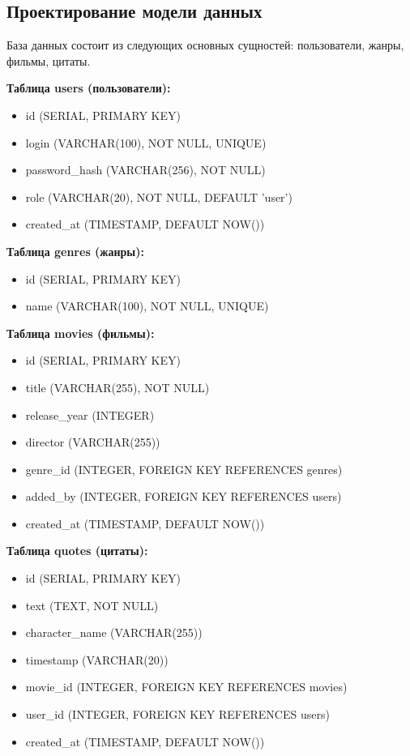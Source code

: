 \subsection{Проектирование модели данных}

База данных состоит из следующих основных сущностей: пользователи, жанры, фильмы, цитаты.

\textbf{Таблица users (пользователи):}
\begin{itemize}
    \item id (SERIAL, PRIMARY KEY)
    \item login (VARCHAR(100), NOT NULL, UNIQUE)
    \item password\_hash (VARCHAR(256), NOT NULL)
    \item role (VARCHAR(20), NOT NULL, DEFAULT 'user')
    \item created\_at (TIMESTAMP, DEFAULT NOW())
\end{itemize}

\textbf{Таблица genres (жанры):}
\begin{itemize}
    \item id (SERIAL, PRIMARY KEY)
    \item name (VARCHAR(100), NOT NULL, UNIQUE)
\end{itemize}

\textbf{Таблица movies (фильмы):}
\begin{itemize}
    \item id (SERIAL, PRIMARY KEY)
    \item title (VARCHAR(255), NOT NULL)
    \item release\_year (INTEGER)
    \item director (VARCHAR(255))
    \item genre\_id (INTEGER, FOREIGN KEY REFERENCES genres)
    \item added\_by (INTEGER, FOREIGN KEY REFERENCES users)
    \item created\_at (TIMESTAMP, DEFAULT NOW())
\end{itemize}

\textbf{Таблица quotes (цитаты):}
\begin{itemize}
    \item id (SERIAL, PRIMARY KEY)
    \item text (TEXT, NOT NULL)
    \item character\_name (VARCHAR(255))
    \item timestamp (VARCHAR(20))
    \item movie\_id (INTEGER, FOREIGN KEY REFERENCES movies)
    \item user\_id (INTEGER, FOREIGN KEY REFERENCES users)
    \item created\_at (TIMESTAMP, DEFAULT NOW())
\end{itemize}

